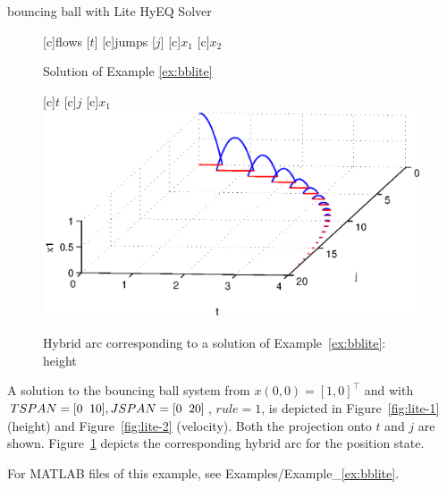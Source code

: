 \begin{example}{bouncing ball with Lite HyEQ Solver}
\begin{figure}[ht]
  \centering
  [c]{flows [$t$]}
  [c]{jumps [$j$]}
  [c]{$x_1$}
  [c]{$x_2$}
\qquad
{}
\caption{Solution of Example \ref{ex:bblite}}
\end{figure}

\begin{figure}[ht]
  \begin{center}
  [c]{$t$}
  [c]{$j$}
  [c]{$x_1$}
    \includegraphics[width=.8\textwidth]{figures/Examples/HybridArclite.eps}
   \caption{Hybrid arc corresponding to a solution of Example~\ref{ex:bblite}: height}
\label{fig:lite-3}
  \end{center}
\end{figure}

A solution to the bouncing ball system from $x(0,0)=[1,0]^\top$ and with $TSPAN = [0 \hspace{2mm} 10], JSPAN = [0 \hspace{2mm} 20]$, $rule =1$, is depicted in Figure~\ref{fig:lite-1} (height) and Figure~\ref{fig:lite-2} (velocity).  Both the projection onto $t$ and $j$ are shown. Figure~\ref{fig:lite-3} depicts the corresponding hybrid arc for the position state.

For MATLAB files of this example, see Examples/Example\_\ref{ex:bblite}.

\end{example}
